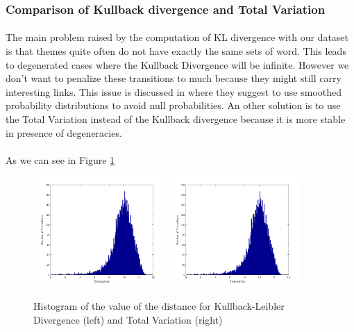 \subsubsection{Comparison of Kullback divergence and Total Variation}

\paragraph{}
The main problem raised by the computation of KL divergence with our dataset is that themes quite often do not have exactly the same sets of word. This leads to degenerated cases where the Kullback Divergence will be infinite. However we don't want to penalize these transitions to much because they might still carry interesting links. This issue is discussed in \cite{de2010grammatical} where they suggest to use smoothed probability distributions to avoid null probabilities. An other solution is to use the Total Variation instead of the Kullback divergence because it is more stable in presence of degeneracies.

\paragraph{}
As we can see in Figure \ref{fig:divergence} 
\begin{center}
\begin{figure}[H]
	\label{fig:divergence}
	\includegraphics[width=0.45\textwidth]{images/divergence}
	\includegraphics[width=0.45\textwidth]{images/divergence}
	\caption{Histogram of the value of the distance for Kullback-Leibler Divergence (left) and Total Variation (right)}
\end{figure}
\end{center}

